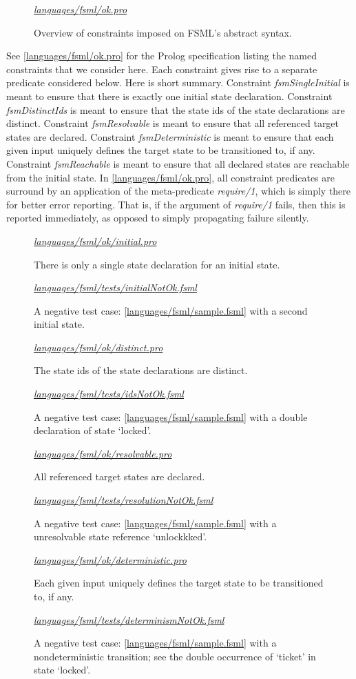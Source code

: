\documentclass[preprint,authoryear,12pt]{noelsarticle}
\newcommand{\codefigure}[3]{
\begin{figure}[t!]
\begin{boxedminipage}{\hsize}
\mbox{}\hfill{}{\small\textit{\href{http://github.com/slebok/slepro/tree/master/#2}{#2}}}

\end{boxedminipage}
\caption{#1.}
\label{#2}
\medskip
\end{figure}}
\begin{document}
\codefigure{%
Overview of constraints imposed on FSML's abstract syntax}{%
languages/fsml/ok.pro}{%
prolog}

See \autoref{languages/fsml/ok.pro} for the Prolog specification
listing the named constraints that we consider here. Each constraint
gives rise to a separate predicate considered below. Here is short
summary. Constraint \emph{fsmSingleInitial} is meant to ensure that
there is exactly one initial state declaration. Constraint
\emph{fsmDistinctIds} is meant to ensure that the state ids of the
state declarations are distinct. Constraint \emph{fsmResolvable} is
meant to ensure that all referenced target states are
declared. Constraint \emph{fsmDeterministic} is meant to ensure that
each given input uniquely defines the target state to be transitioned
to, if any. Constraint \emph{fsmReachable} is meant to ensure that all
declared states are reachable from the initial state. In
\autoref{languages/fsml/ok.pro}, all constraint predicates are
surround by an application of the meta-predicate \emph{require/1},
which is simply there for better error reporting. That is, if the
argument of \emph{require/1} fails, then this is reported immediately,
as opposed to simply propagating failure silently.

\codefigure{%
There is only a single state declaration for an initial state}{%
languages/fsml/ok/initial.pro}{%
prolog}

\codefigure{%
A negative test case: \autoref{languages/fsml/sample.fsml} with a second initial state}{%
languages/fsml/tests/initialNotOk.fsml}{%
fsml}

\codefigure{%
The state ids of the state declarations are distinct}{%
languages/fsml/ok/distinct.pro}{%
prolog}

\codefigure{%
A negative test case: \autoref{languages/fsml/sample.fsml} with a
double declaration of state `locked'}{%
languages/fsml/tests/idsNotOk.fsml}{%
fsml}

\codefigure{%
All referenced target states are declared}{%
languages/fsml/ok/resolvable.pro}{%
prolog}

\codefigure{%
A negative test case: \autoref{languages/fsml/sample.fsml} with a
unresolvable state reference `unlockkked'}{%
languages/fsml/tests/resolutionNotOk.fsml}{%
fsml}

\codefigure{%
Each given input uniquely defines the target state to be transitioned to, if any}{%
languages/fsml/ok/deterministic.pro}{%
prolog}

\codefigure{%
A negative test case: \autoref{languages/fsml/sample.fsml} with a
nondeterministic transition; see the double occurrence of `ticket' in
state `locked'}{%
languages/fsml/tests/determinismNotOk.fsml}{%
fsml}
\end{document}
